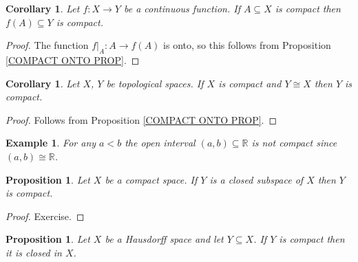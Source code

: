 \documentclass[11pt, letterpaper, oneside]{report}
\theoremstyle{pplain}
\newtheorem{proposition}[theorem]{Proposition}
\newtheorem{corollary}[theorem]{Corollary}
\newtheorem{ITERMVALUE THM}[theorem]{Intermediate Value Theorem}
\newtheorem{HEINEBOREL THM}[theorem]{Heine-Borel Theorem}
\newtheorem{UMETR THM}[theorem]{Urysohn Metrization Theorem}
\newtheorem{UMETR2 THM}[theorem]{Urysohn Metrization Theorem (v.2)}
\theoremstyle{ddefinition}
\newtheorem{example}[theorem]{Example}
\theoremstyle{nnn}
\newtheorem{TDA NN}[theorem]{Topological Data Analysis. }
\theoremstyle{eexercise}
\newcommand{\R}{{\mathbb R}}
\newcommand{\ssmin}{\smallsetminus}
\begin{document}
\begin{corollary}
\label{COMPACT IMAGE COR}
Let $f\colon X\to Y$ be a continuous function. If  $A\subseteq X$ is compact  then $f(A)\subseteq Y$ is compact. 
\end{corollary}

\begin{proof}
The function $f|_{A}\colon A \to f(A)$ is onto, so this follows from Proposition \ref{COMPACT ONTO PROP}.
\end{proof}

\begin{corollary}
\label{COMP TOP INV PROP}
Let $X$, $Y$ be topological spaces.
If $X$ is  compact  and $Y \cong X$ then $Y$ is compact. 
\end{corollary}

\begin{proof}
Follows from Proposition \ref{COMPACT ONTO PROP}.
\end{proof}


\begin{example}
For any $a< b$ the open interval $(a, b)\subseteq \R$ is not compact since $(a, b)\cong \R$. 
\end{example}



\begin{proposition}
\label{CLOSED SUBSP OF COMPACT PROP}
Let $X$ be a compact space. If $Y$ is a closed subspace of $X$ then $Y$ is compact. 
\end{proposition}


\begin{proof}
Exercise.
\end{proof}

\begin{proposition}
\label{COMPACT SUBSPACE PROP}
Let $X$ be a  Hausdorff space and let  $Y\subseteq X$. If $Y$ is compact then it is closed in $X$. 
\end{proposition}
\end{document}
